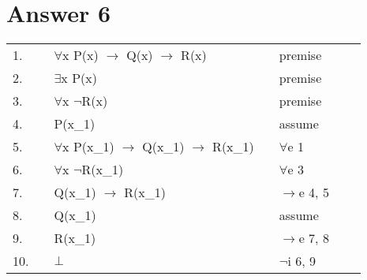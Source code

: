 \documentclass[12pt]{article}
\begin{document}
\section*{Answer 6}
\begin{table}[H]
\centering
\begin{tabular}{|lllllll|}
\hline
1.                        &                       & $\forall$x P(x) $\rightarrow$ Q(x) $\rightarrow$ R(x)          &  & premise                                  &                       &  \\
2.                        &                       & $\exists$x P(x)                                                &  & premise                                  &                       &  \\
3.                        &                       & $\forall$x $\neg$R(x)                                          &  & premise                                  &                       &  \\ \cline{2-6}
\multicolumn{1}{|l|}{4.}  &                       & P(x\_1)                                                        &  & assume                                   & \multicolumn{1}{l|}{} &  \\
\multicolumn{1}{|l|}{5.}  &                       & $\forall$x P(x\_1) $\rightarrow$ Q(x\_1) $\rightarrow$ R(x\_1) &  & $\forall$e 1                             & \multicolumn{1}{l|}{} &  \\
\multicolumn{1}{|l|}{6.}  &                       & $\forall$x $\neg$R(x\_1)                                       &  & $\forall$e 3                             & \multicolumn{1}{l|}{} &  \\
\multicolumn{1}{|l|}{7.}  &                       & Q(x\_1) $\rightarrow$ R(x\_1)                                  &  & $\rightarrow$e 4, 5                      & \multicolumn{1}{l|}{} &  \\ \cline{3-5}
\multicolumn{1}{|l|}{8.}  & \multicolumn{1}{l|}{} & Q(x\_1)                                                        &  & \multicolumn{1}{l|}{assume}              & \multicolumn{1}{l|}{} &  \\
\multicolumn{1}{|l|}{9.}  & \multicolumn{1}{l|}{} & R(x\_1)                                                        &  & \multicolumn{1}{l|}{$\rightarrow$e 7, 8} & \multicolumn{1}{l|}{} &  \\
\multicolumn{1}{|l|}{10.} & \multicolumn{1}{l|}{} & $\bot$                                                         &  & \multicolumn{1}{l|}{$\neg$i 6, 9}        & \multicolumn{1}{l|}{} &  \\ \cline{3-5}

\end{tabular}
\end{table}
\end{document}
